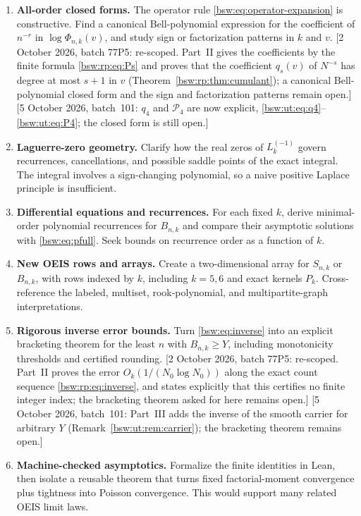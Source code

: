 \documentclass[11pt,letterpaper]{article}
\theoremstyle{definition}
\theoremstyle{remark}
\begin{document}
\begin{enumerate}[leftmargin=2em]
\item \textbf{All-order closed forms.}
The operator rule \eqref{bsw:eq:operator-expansion} is constructive.  Find a
canonical Bell-polynomial expression for the coefficient of $n^{-r}$ in
$\log\Phi_{n,k}(v)$, and study sign or factorization patterns in $k$ and $v$.
[2 October 2026, batch 77P5: re-scoped.  Part~II gives the coefficients by
the finite formula \eqref{bsw:rp:eq:Ps} and proves that the coefficient
$q_s(v)$ of $N^{-s}$ has degree at most $s+1$ in $v$
(Theorem~\ref{bsw:rp:thm:cumulant}); a canonical Bell-polynomial closed
form and the sign and factorization patterns remain open.]
[5 October 2026, batch~101: $q_4$ and $\mathcal P_4$ are now explicit,
\eqref{bsw:ut:eq:q4}--\eqref{bsw:ut:eq:P4}; the closed form is still
open.]

\item \textbf{Laguerre-zero geometry.}
Clarify how the real zeros of $L_k^{(-1)}$ govern recurrences, cancellations,
and possible saddle points of the exact integral.  The integral involves a
sign-changing polynomial, so a naive positive Laplace principle is
insufficient.

\item \textbf{Differential equations and recurrences.}
For each fixed $k$, derive minimal-order polynomial recurrences for
$B_{n,k}$ and compare their asymptotic solutions with \eqref{bsw:eq:pfull}.  Seek
bounds on recurrence order as a function of $k$.

\item \textbf{New OEIS rows and arrays.}
Create a two-dimensional array for $S_{n,k}$ or $B_{n,k}$, with rows indexed
by $k$, including $k=5,6$ and exact kernels $P_k$.  Cross-reference the
labeled, multiset, rook-polynomial, and multipartite-graph interpretations.

\item \textbf{Rigorous inverse error bounds.}
Turn \eqref{bsw:eq:inverse} into an explicit bracketing theorem for the least
$n$ with $B_{n,k}\ge Y$, including monotonicity thresholds and certified
rounding.
[2 October 2026, batch 77P5: re-scoped.  Part~II proves the error
$O_k(1/(N_0\log N_0))$ along the exact count sequence
\eqref{bsw:rp:eq:inverse}, and states explicitly that this certifies no
finite integer index; the bracketing theorem asked for here remains
open.]
[5 October 2026, batch~101: Part~III adds the inverse of the smooth
carrier for arbitrary $Y$ (Remark~\ref{bsw:ut:rem:carrier}); the
bracketing theorem remains open.]

\item \textbf{Machine-checked asymptotics.}
Formalize the finite identities in Lean, then isolate a reusable theorem that
turns fixed factorial-moment convergence plus tightness into Poisson
convergence.  This would support many related OEIS limit laws.


\end{enumerate}
\end{document}
